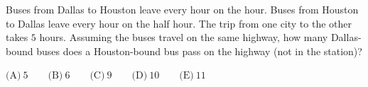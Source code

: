 Buses from Dallas to Houston leave every hour on the hour. Buses from Houston to Dallas leave every hour on the half hour. The trip from one city to the other takes $5$ hours. Assuming the buses travel on the same highway, how many Dallas-bound buses does a Houston-bound bus pass on the highway (not in the station)?

$\text{(A)}\ 5\qquad\text{(B)}\ 6\qquad\text{(C)}\ 9\qquad\text{(D)}\ 10\qquad\text{(E)}\ 11$
